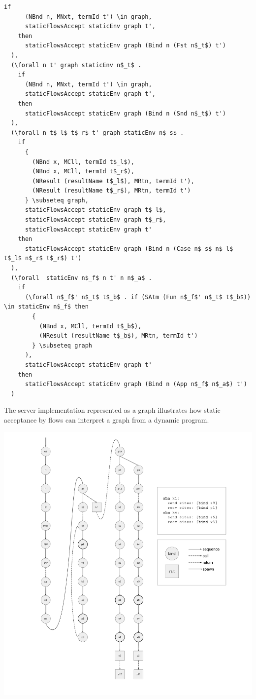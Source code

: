 \documentclass[10pt]{article}
\begin{document}
\begin{lstlisting}[language=logic, mathescape]
    if
      (NBnd n, MNxt, termId t') \in graph, 
      staticFlowsAccept staticEnv graph t', 
    then
      staticFlowsAccept staticEnv graph (Bind n (Fst n$_t$) t')
  ),
  (\forall n t' graph staticEnv n$_t$ .
    if
      (NBnd n, MNxt, termId t') \in graph, 
      staticFlowsAccept staticEnv graph t', 
    then
      staticFlowsAccept staticEnv graph (Bind n (Snd n$_t$) t')
  ),
  (\forall n t$_l$ t$_r$ t' graph staticEnv n$_s$ .
    if
      {
        (NBnd x, MCll, termId t$_l$),
        (NBnd x, MCll, termId t$_r$),
        (NResult (resultName t$_l$), MRtn, termId t'),
        (NResult (resultName t$_r$), MRtn, termId t')
      } \subseteq graph, 
      staticFlowsAccept staticEnv graph t$_l$, 
      staticFlowsAccept staticEnv graph t$_r$,
      staticFlowsAccept staticEnv graph t'
    then
      staticFlowsAccept staticEnv graph (Bind n (Case n$_s$ n$_l$ t$_l$ n$_r$ t$_r$) t')
  ),
  (\forall  staticEnv n$_f$ n t' n n$_a$ .
    if
      (\forall n$_f$' n$_t$ t$_b$ . if (SAtm (Fun n$_f$' n$_t$ t$_b$)) \in staticEnv n$_f$ then 
        {
          (NBnd x, MCll, termId t$_b$),
          (NResult (resultName t$_b$), MRtn, termId t')
        } \subseteq graph
      ),
      staticFlowsAccept staticEnv graph t'
    then
      staticFlowsAccept staticEnv graph (Bind n (App n$_f$ n$_a$) t')
  )
\end{lstlisting}

The server implementation represented as a graph illustrates how static acceptance by flows can interpret
a graph from a dynamic program.

\includegraphics[width=1.3\textwidth, left]{cml-graph.pdf}
\end{document}
